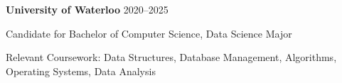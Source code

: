 \textbf{University of Waterloo} \hfill 2020--2025\par
Candidate for Bachelor of Computer Science, Data Science Major \par %
Relevant Coursework: Data Structures, Database Management, Algorithms, Operating Systems, Data Analysis \par
\vspace{0.1cm} \par

